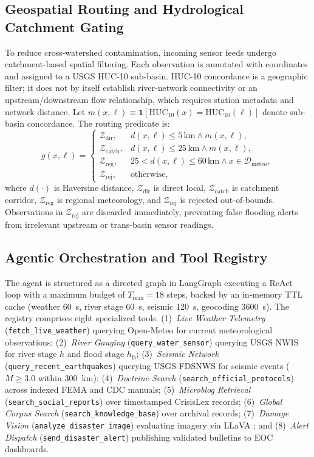 \documentclass[conference]{IEEEtran}
\begin{document}
\subsection{Geospatial Routing and Hydrological Catchment Gating}
To reduce cross-watershed contamination, incoming sensor feeds undergo catchment-based spatial filtering. Each observation is annotated with coordinates and assigned to a USGS HUC-10 sub-basin. HUC-10 concordance is a geographic filter; it does not by itself establish river-network connectivity or an upstream/downstream flow relationship, which requires station metadata and network distance. Let $m(x,\ell) \equiv \mathbf{1}[\mathrm{HUC}_{10}(x) = \mathrm{HUC}_{10}(\ell)]$ denote sub-basin concordance. The routing predicate is:
\begin{equation}
\label{eq:geo_gate}
g(x, \ell) =
\begin{cases}
\mathcal{Z}_{\mathrm{dir}}, & d(x,\ell) \le 5\,\text{km} \land m(x,\ell),\\[2pt]
\mathcal{Z}_{\mathrm{catch}}, & d(x,\ell) \le 25\,\text{km} \land m(x,\ell),\\[2pt]
\mathcal{Z}_{\mathrm{reg}}, & 25 < d(x,\ell) \le 60\,\text{km} \land x \in \mathcal{D}_{\mathrm{meteo}},\\[2pt]
\mathcal{Z}_{\mathrm{rej}}, & \text{otherwise,}
\end{cases}
\end{equation}
where $d(\cdot)$ is Haversine distance, $\mathcal{Z}_{\mathrm{dir}}$ is direct local, $\mathcal{Z}_{\mathrm{catch}}$ is catchment corridor, $\mathcal{Z}_{\mathrm{reg}}$ is regional meteorology, and $\mathcal{Z}_{\mathrm{rej}}$ is rejected out-of-bounds. Observations in $\mathcal{Z}_{\mathrm{rej}}$ are discarded immediately, preventing false flooding alerts from irrelevant upstream or trans-basin sensor readings.

\subsection{Agentic Orchestration and Tool Registry}
The agent is structured as a directed graph in LangGraph \cite{langgraph} executing a ReAct loop \cite{react} with a maximum budget of $T_{\max} = 18$ steps, backed by an in-memory TTL cache (weather 60~s, river stage 60~s, seismic 120~s, geocoding 3600~s). The registry comprises eight specialized tools: (1)~\textit{Live Weather Telemetry} (\texttt{fetch\_live\_weather}) querying Open-Meteo for current meteorological observations; (2)~\textit{River Gauging} (\texttt{query\_water\_sensor}) querying USGS NWIS for river stage $h$ and flood stage $h_{\mathrm{fs}}$; (3)~\textit{Seismic Network} (\texttt{query\_recent\_earthquakes}) querying USGS FDSNWS for seismic events ($M \ge 3.0$ within 300~km); (4)~\textit{Doctrine Search} (\texttt{search\_official\_protocols}) across indexed FEMA and CDC manuals; (5)~\textit{Microblog Retrieval} (\texttt{search\_social\_reports}) over timestamped CrisisLex records; (6)~\textit{Global Corpus Search} (\texttt{search\_knowledge\_base}) over archival records; (7)~\textit{Damage Vision} (\texttt{analyze\_disaster\_image}) evaluating imagery via LLaVA \cite{llava}; and (8)~\textit{Alert Dispatch} (\texttt{send\_disaster\_alert}) publishing validated bulletins to EOC dashboards.
\end{document}

